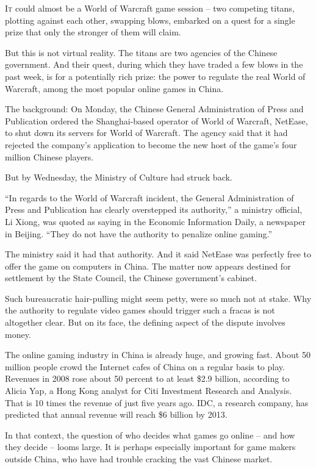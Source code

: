 ﻿\documentclass[12pt]{article}
\begin{document}
\lettrine{I}{t} could almost be a World of Warcraft game session -- two
competing titans, plotting against each other, swapping blows, embarked on a quest for a single
prize that only the stronger of them will claim.

But this is not virtual reality. The titans are two agencies of the Chinese government. And their
quest, during which they have traded a few blows in the past week, is for a potentially rich prize:
the power to regulate the real World of Warcraft, among the most popular online games in China.

The background: On Monday, the Chinese General Administration of Press and Publication ordered the
Shanghai-based operator of World of Warcraft, NetEase, to shut down its servers for World of
Warcraft. The agency said that it had rejected the company's application to become the new host of
the game's four million Chinese players.

But by Wednesday, the Ministry of Culture had struck back.

``In regards to the World of Warcraft incident, the General Administration of Press and Publication
has clearly overstepped its authority,'' a ministry official, Li Xiong, was quoted as saying in the
Economic Information Daily, a newspaper in Beijing. ``They do not have the authority to penalize
online gaming.''

The ministry said it had that authority. And it said NetEase was perfectly free to offer the game on
computers in China. The matter now appears destined for settlement by the State Council, the Chinese
government's cabinet.

Such bureaucratic hair-pulling might seem petty, were so much not at stake. Why the authority to
regulate video games should trigger such a fracas is not altogether clear. But on its face, the
defining aspect of the dispute involves money.

The online gaming industry in China is already huge, and growing fast. About 50 million people crowd
the Internet cafes of China on a regular basis to play. Revenues in 2008 rose about 50 percent to at
least \$2.9 billion, according to Alicia Yap, a Hong Kong analyst for Citi Investment Research and
Analysis. That is 10 times the revenue of just five years ago. IDC, a research company, has
predicted that annual revenue will reach \$6 billion by 2013.

In that context, the question of who decides what games go online -- and how they decide -- looms
large. It is perhaps especially important for game makers outside China, who have had trouble
cracking the vast Chinese market.
\end{document}
